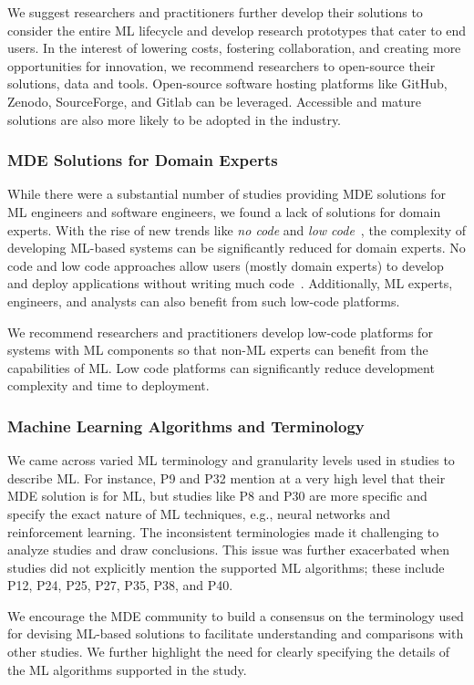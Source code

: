 We suggest researchers and practitioners further develop their solutions to consider the entire ML lifecycle and develop research prototypes that cater to end users. In the interest of lowering costs, fostering collaboration, and creating more opportunities for innovation, we recommend researchers to open-source their solutions, data and tools. Open-source software hosting platforms like GitHub, Zenodo, SourceForge, and Gitlab can be leveraged. Accessible and mature solutions are also more likely to be adopted in the industry. 

\subsubsection{MDE Solutions for Domain Experts}
While there were a substantial number of studies providing MDE solutions for ML engineers and software engineers, we found a lack of solutions for domain experts. With the rise of new trends like \textit{no code} and \textit{low code}~\cite{cabot2020positioning}, the complexity of developing ML-based systems can be significantly reduced for domain experts. No code and low code approaches allow users (mostly domain experts) to develop and deploy applications without writing much code~\cite{cabot2020positioning}. Additionally, ML experts, engineers, and analysts can also benefit from such low-code platforms.

We recommend researchers and practitioners develop low-code platforms for systems with ML components so that non-ML experts can benefit from the capabilities of ML. Low code platforms can significantly reduce development complexity and time to deployment.

\subsubsection{Machine Learning Algorithms and Terminology}
We came across varied ML terminology and granularity levels used in studies to describe ML. For instance, P9 and P32 mention at a very high level that their MDE solution is for ML, but studies like P8 and P30 are more specific and specify the exact nature of ML techniques, e.g., neural networks and reinforcement learning. The inconsistent terminologies made it challenging to analyze studies and draw conclusions. This issue was further exacerbated when studies did not explicitly mention the supported ML algorithms; these include P12, P24, P25, P27, P35, P38, and P40. 

We encourage the MDE community to build a consensus on the terminology used for devising ML-based solutions to facilitate understanding and comparisons with other studies. We further highlight the need for clearly specifying the details of the ML algorithms supported in the study.



